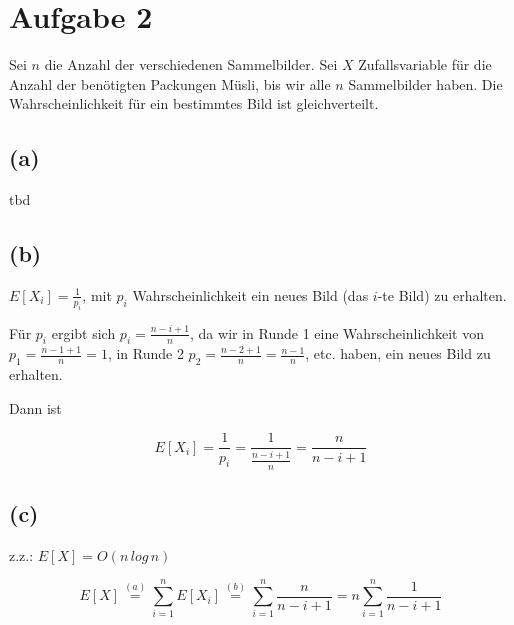 \documentclass[11pt,a4paper,ngerman]{article}
\begin{document}

\section*{Aufgabe 2}

Sei $n$ die Anzahl der verschiedenen Sammelbilder. Sei $X$ Zufallsvariable für die Anzahl der benötigten Packungen Müsli, bis wir alle $n$ Sammelbilder haben. Die Wahrscheinlichkeit für ein bestimmtes Bild ist gleichverteilt.


\subsection*{(a)}

tbd




\subsection*{(b)}
$E[X_{i}]=\frac{1}{p_{i}}$, mit $p_{i}$ Wahrscheinlichkeit ein neues
Bild (das $i$-te Bild) zu erhalten.

Für $p_{i}$ ergibt sich $p_{i}=\frac{n-i+1}{n}$, da wir in Runde
1 eine Wahrscheinlichkeit von $p_{1}=\frac{n-1+1}{n}=1$, in Runde
2 $p_{2}=\frac{n-2+1}{n}=\frac{n-1}{n}$, etc. haben, ein neues Bild
zu erhalten.

Dann ist

\[
E[X_{i}]=\frac{1}{p_{i}}=\frac{1}{\frac{n-i+1}{n}}=\frac{n}{n-i+1}
\]




\subsection*{(c)}


z.z.: $E[X]=O(n\, log\, n)$

\[
E[X]\stackrel{(a)}{=}\sum_{i=1}^{n}E[X_{i}]\stackrel{(b)}{=}\sum_{i=1}^{n}\frac{n}{n-i+1}=n\sum_{i=1}^{n}\frac{1}{n-i+1}
\]
\end{document}
